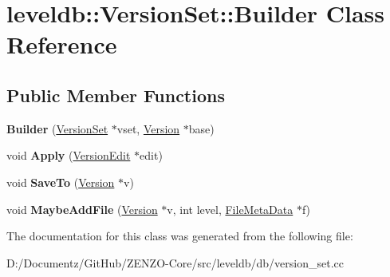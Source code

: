 \hypertarget{classleveldb_1_1_version_set_1_1_builder}{}\section{leveldb\+::Version\+Set\+::Builder Class Reference}
\label{classleveldb_1_1_version_set_1_1_builder}
\subsection*{Public Member Functions}
\begin{DoxyCompactItemize}
\item 
\mbox{\label{classleveldb_1_1_version_set_1_1_builder_a19d0dd9aec1b825e7d938e9ac24dc4f7}} 
{\bfseries Builder} (\mbox{\hyperlink{classleveldb_1_1_version_set}{Version\+Set}} $\ast$vset, \mbox{\hyperlink{classleveldb_1_1_version}{Version}} $\ast$base)
\item 
\mbox{\label{classleveldb_1_1_version_set_1_1_builder_aef505b4363ebc56b8fa5deb55087993f}} 
void {\bfseries Apply} (\mbox{\hyperlink{classleveldb_1_1_version_edit}{Version\+Edit}} $\ast$edit)
\item 
\mbox{\label{classleveldb_1_1_version_set_1_1_builder_a429b23cc022cac08ab2ba880ac5803d1}} 
void {\bfseries Save\+To} (\mbox{\hyperlink{classleveldb_1_1_version}{Version}} $\ast$v)
\item 
\mbox{\label{classleveldb_1_1_version_set_1_1_builder_aa90e0d9d0f8e05b8bcfa879d4f4a88c6}} 
void {\bfseries Maybe\+Add\+File} (\mbox{\hyperlink{classleveldb_1_1_version}{Version}} $\ast$v, int level, \mbox{\hyperlink{structleveldb_1_1_file_meta_data}{File\+Meta\+Data}} $\ast$f)
\end{DoxyCompactItemize}


The documentation for this class was generated from the following file\+:\begin{DoxyCompactItemize}
\item 
D\+:/\+Documentz/\+Git\+Hub/\+Z\+E\+N\+Z\+O-\/\+Core/src/leveldb/db/version\+\_\+set.\+cc\end{DoxyCompactItemize}
